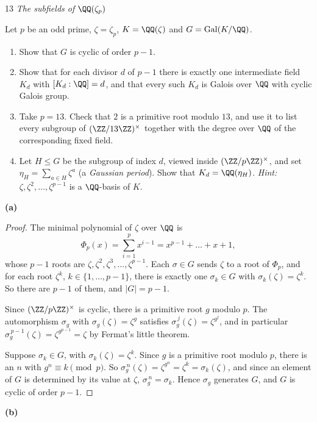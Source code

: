 \documentclass[11pt]{article}
\begin{document}
\begin{problem}{13}
  \textit{The subfields of $\QQ(\zeta_p)$}\par
  Let $p$ be an odd prime, $\zeta=\zeta_p$, $K=\QQ(\zeta)$ and $G=\operatorname{Gal}(K/\QQ)$.
  \begin{enumerate}[label=(\alph*)]
    \item Show that $G$ is cyclic of order $p-1$.
    \item Show that for each divisor $d$ of $p-1$ there is exactly one intermediate field $K_d$ with $[K_d:\QQ]=d$, and that every such $K_d$ is Galois over $\QQ$ with cyclic Galois group.
    \item Take $p=13$. Check that $2$ is a primitive root modulo $13$, and use it to list every subgroup of $(\ZZ/13\ZZ)^\times$ together with the degree over $\QQ$ of the corresponding fixed field.
    \item Let $H\le G$ be the subgroup of index $d$, viewed inside $(\ZZ/p\ZZ)^\times$, and set $\eta_H=\sum_{a\in H}\zeta^a$ (a \emph{Gaussian period}). Show that $K_d=\QQ(\eta_H)$. \emph{Hint:} $\zeta,\zeta^2,\dots,\zeta^{p-1}$ is a $\QQ$-basis of $K$.
  \end{enumerate}
\end{problem}
\noindent\textbf{(a)}
\begin{proof}
The minimal polynomial of $\zeta$ over $\QQ$ is
\[ \Phi_p(x)=\sum_{i=1}^{p}x^{i-1}=x^{p-1}+\dots+x+1, \]
whose $p-1$ roots are $\zeta,\zeta^2,\zeta^3,\dots,\zeta^{p-1}$. Each $\sigma\in G$ sends $\zeta$ to a root of $\Phi_p$, and for each root $\zeta^k$, $k\in\{1,\dots,p-1\}$, there is exactly one $\sigma_k\in G$ with $\sigma_k(\zeta)=\zeta^k$. So there are $p-1$ of them, and $|G|=p-1$.

Since $(\ZZ/p\ZZ)^\times$ is cyclic, there is a primitive root $g$ modulo $p$. The automorphism $\sigma_g$ with $\sigma_g(\zeta)=\zeta^g$ satisfies $\sigma_g^{\,j}(\zeta)=\zeta^{g^j}$, and in particular $\sigma_g^{\,p-1}(\zeta)=\zeta^{g^{p-1}}=\zeta$ by Fermat's little theorem.

Suppose $\sigma_k\in G$, with $\sigma_k(\zeta)=\zeta^k$. Since $g$ is a primitive root modulo $p$, there is an $n$ with $g^n\equiv k\pmod p$. So $\sigma_g^{\,n}(\zeta)=\zeta^{g^n}=\zeta^k=\sigma_k(\zeta)$, and since an element of $G$ is determined by its value at $\zeta$, $\sigma_g^{\,n}=\sigma_k$. Hence $\sigma_g$ generates $G$, and $G$ is cyclic of order $p-1$.
\end{proof}
\noindent\textbf{(b)}
\end{document}
